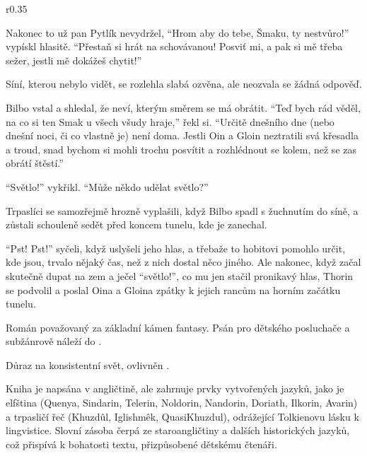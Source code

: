 \documentclass{extarticle} %
\begin{document}
\newpage


\changefontsize{8.7pt}


\noindent\begin{wrapfigure}{r}{0.35\textwidth}
\tiny

\setlength{\parindent}{3pt}
Nakonec to už pan Pytlík nevydržel,
\enquote{Hrom aby do tebe, Šmaku, ty nestvůro!} vypískl hlasitě.
\enquote{Přestaň si hrát na schovávanou!
Posviť mi, a pak si mě třeba sežer, jestli mě dokážeš chytit!}\par
Síní, kterou nebylo vidět, se rozlehla slabá ozvěna, ale neozvala se žádná odpověď.\par
Bilbo vstal a shledal, že neví, kterým směrem se má obrátit.
\enquote{Teď bych rád věděl, na co si ten Smak u všech všudy hraje,} řekl si. 
\enquote{Určitě dnešního dne (nebo dnešní noci, či co vlastně je) není doma.
Jestli Oin a Gloin neztratili svá křesadla a troud,
snad bychom si mohli trochu posvítit a rozhlédnout se kolem, než se zas obrátí štěstí.}\par
\enquote{Světlo!} vykřikl. \enquote{Může někdo udělat světlo?}\par
Trpaslíci se samozřejmě hrozně vyplašili, když Bilbo spadl s žuchnutím do síně,
a zůstali schouleně sedět před koncem tunelu, kde je zanechal.\par
\enquote{Pst! Pst!} syčeli, když uslyšeli jeho hlas,
a třebaže to hobitovi pomohlo určit, kde jsou, trvalo nějaký čas,
než z nich dostal něco jiného.
Ale nakonec, když začal skutečně dupat na zem a ječel \enquote{světlo!},
co mu jen stačil pronikavý hlas, Thorin se podvolil
a poslal Oina a Gloina zpátky k jejich rancům na horním začátku tunelu.\par
\end{wrapfigure}


\noindent Román považovaný za základní kámen fantasy.
Psán pro dětského posluchače a subžánrově náleží do .

\noindent Důraz na konsistentní svět, ovlivněn .

\noindent Kniha je napsána v angličtině, ale zahrnuje prvky vytvořených jazyků,
jako je elfština (Quenya, Sindarin, Telerin, Noldorin, Nandorin, Doriath, Ilkorin, Avarin)
a trpasličí řeč (Khuzdûl, Iglishmêk, QuasiKhuzdul), odrážející Tolkienovu lásku k lingvistice.
Slovní zásoba čerpá ze staroangličtiny a dalších historických jazyků, což přispívá k bohatosti textu,
přizpůsobené dětskému čtenáři.
\end{document}
